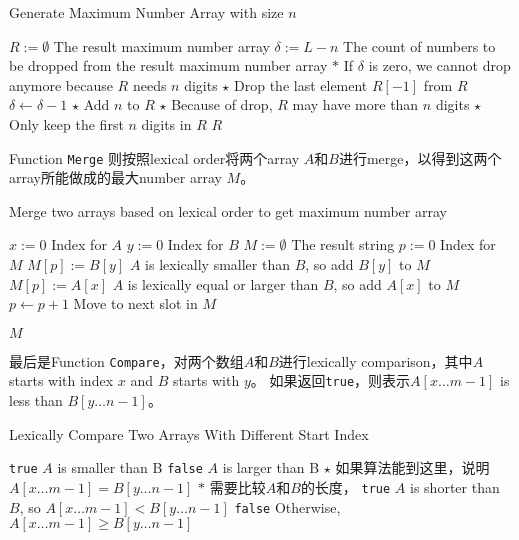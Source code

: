 \begin{algorithm}[H]
\caption{Generate Maximum Number Array with size $ n $}
\begin{algorithmic}[1]
\State $R:=\emptyset$ \Comment The result maximum number array
\State $\delta:=L-n$ \Comment The count of numbers to be dropped from the result maximum number array
\State $\ast$ If $\delta$ is zero, we cannot drop anymore because $R$ needs $n$ digits
\State $\star$ Drop the last element $R[-1]$ from $R$
\State $\delta\gets\delta-1$
\EndWhile
\State $\star$ Add $n$ to $R$
\EndFor
\State $\star$ Because of drop, $R$ may have more than $n$ digits
\State $\star$ Only keep the first $n$ digits in $R$
\State \Return $ R $
\EndFunction
\end{algorithmic}
\end{algorithm}
Function \texttt{Merge} 则按照lexical order将两个array $ A $和$ B $进行merge，以得到这两个array所能做成的最大number array $M$。
\begin{algorithm}[H]
\caption{Merge two arrays based on lexical order to get maximum number array}
\begin{algorithmic}[1]
\State $x:=0$ \Comment Index for $A$
\State $y:=0$ \Comment Index for $B$
\State $M:=\emptyset$ \Comment The result string
\State $p:=0$ \Comment Index for $M$
\State $M[p]:=B[y]$ \Comment $A$ is lexically smaller than $B$, so add $B[y]$ to $M$
\Else
\State $M[p]:=A[x]$ \Comment $A$ is lexically equal or larger than $B$, so add $A[x]$ to $M$
\EndIf
\State $p\gets p+1$ \Comment Move to next slot in $M$
\EndWhile
{}
\end{algorithmic}
\end{algorithm}
\begin{algorithm}[H]
\begin{algorithmic}[1]
\State \Return $M$
\EndProcedure
\end{algorithmic}
\end{algorithm}
最后是Function \texttt{Compare}，对两个数组$A$和$B$进行lexically comparison，其中$A$ starts with index $x$ and $ B $ starts with $y$。 如果返回\texttt{true}，则表示$A[x\ldots m-1]$ is less than $B[y\ldots n-1]$。
\begin{algorithm}[H]
\caption{Lexically Compare Two Arrays With Different Start Index}
\begin{algorithmic}[1]
\State \Return \texttt{true} \Comment $A$ is smaller than B
\State \Return \texttt{false} \Comment $A$ is larger than B
\EndIf
\EndWhile
\State $\star$ 如果算法能到这里，说明 $A[x\ldots m-1]=B[y\ldots n-1]$
\State $\ast$ 需要比较$A$和$B$的长度，
\State \Return \texttt{true} \Comment $A$ is shorter than $B$, so $A[x\ldots m-1]<B[y\ldots n-1]$
\EndIf
\State \Return \texttt{false} \Comment Otherwise, $A[x\ldots m-1]\geq B[y\ldots n-1]$
\EndProcedure
\end{algorithmic}
\end{algorithm}
